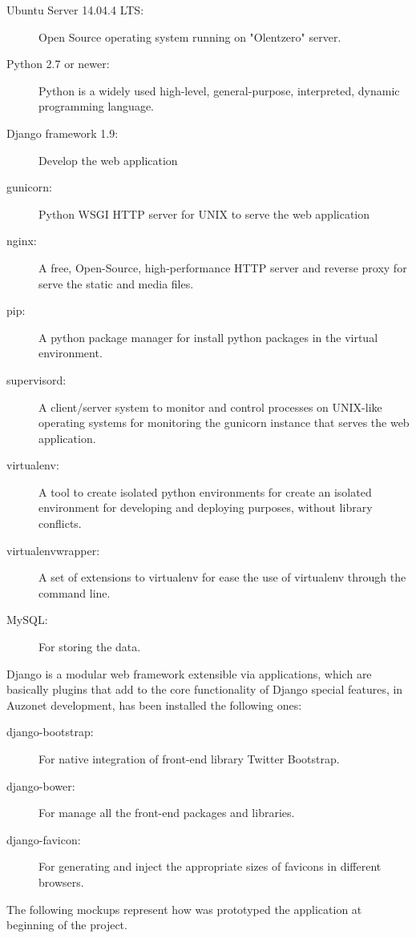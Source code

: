\documentclass{DeustoFDP}
\begin{document}
\begin{description}
	\item[Ubuntu Server 14.04.4 LTS:] Open Source operating system running on "Olentzero" server.
	\item[Python 2.7 or newer:] Python is a widely used high-level, general-purpose, interpreted, dynamic programming language.
	\item[Django framework 1.9:] Develop the web application
	\item[gunicorn:] Python WSGI HTTP server for UNIX to serve the web application
	\item[nginx:] A free, Open-Source, high-performance HTTP server and reverse proxy for serve the static and media files.
	\item[pip:] A python package manager for install python packages in the virtual environment.
	\item[supervisord:] A client/server system to monitor and control processes on UNIX-like operating systems for monitoring the gunicorn instance that serves the web application.
	\item[virtualenv:] A tool to create isolated python environments for create an isolated environment for developing and deploying purposes, without library conflicts.
	\item[virtualenvwrapper:] A set of extensions to virtualenv for ease the use of virtualenv through the command line.
	\item[MySQL:] For storing the data.
\end{description}

Django is a modular web framework extensible via applications, which are basically plugins that add to the core functionality of Django special features, in Auzonet development, has been installed the following ones:

\begin{description}
	\item[django-bootstrap:] For native integration of front-end library Twitter Bootstrap.
	\item[django-bower:] For manage all the front-end packages and libraries.
	\item[django-favicon:] For generating and inject the appropriate sizes of favicons in different browsers. 
\end{description}

The following mockups represent how was prototyped the application at beginning of the project.
\end{document}
